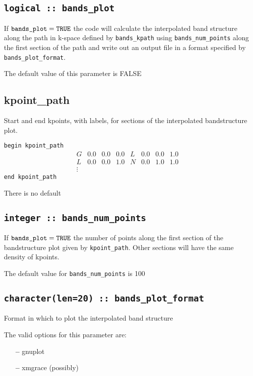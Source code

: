 \subsection[bands\_plot]{\tt logical :: bands\_plot}

If $\verb#bands_plot#=\verb#TRUE#$ the code will calculate the interpolated band structure along
the path in k-space defined by \verb#bands_kpath# using \verb#bands_num_points# along the first
section of the path and write out an output file in a format specified
by \verb#bands_plot_format#. 

The default value of this parameter is FALSE


\subsection[kpoint\_path]{kpoint\_path}
Start and end kpoints, with labels, for sections of the interpolated
bandstructure plot.

\noindent  \verb#begin kpoint_path#
$$
\begin{array}{cccccccc}
G & 0.0 & 0.0 & 0.0 & L & 0.0 & 0.0 & 1.0 \\
L & 0.0 & 0.0 & 1.0 & N & 0.0 & 1.0 & 1.0 \\
\vdots
\end{array}
$$
\verb#end kpoint_path#

There is no default

\subsection[bands\_num\_points]{\tt integer :: bands\_num\_points}

If $\verb#bands_plot#=\verb#TRUE#$ the number of points along the first
section of the bandstructure plot given by \verb#kpoint_path#. Other
sections will have the same density of kpoints.

The default value for \verb#bands_num_points# is 100


\subsection[bands\_plot\_format]{\tt character(len=20) :: bands\_plot\_format}

Format in which to plot the interpolated band structure

The valid options for this parameter are:
\begin{itemize}
\item[{\bf --}] gnuplot
\item[{\bf --}] xmgrace (possibly)
\end{itemize}

